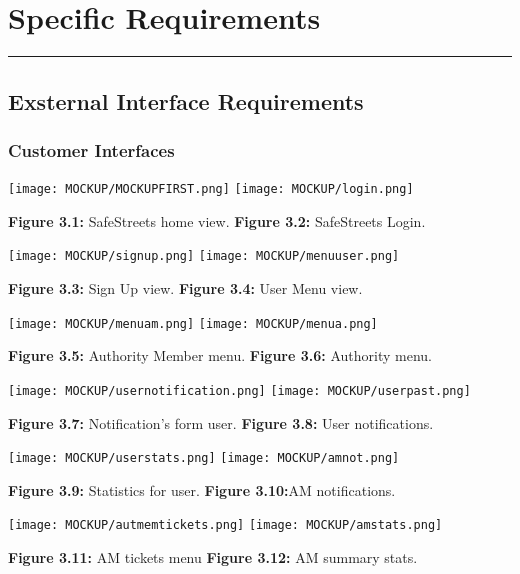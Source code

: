 \documentclass[12pt]{article}
\begin{document}
\newpage
\section{Specific Requirements}
\hrule
\vspace{8mm}
\subsection{Exsternal Interface Requirements}
\vspace{2mm}
\subsubsection{Customer Interfaces}
\vspace{3mm}
		 
		 \texttt{[image: MOCKUP/MOCKUPFIRST.png]}                  \hfill \texttt{[image: MOCKUP/login.png]}
		 
		 \textbf{Figure 3.1:} SafeStreets home view.  \hfill \textbf{Figure 3.2:} SafeStreets Login.
		
\newpage
 	 \texttt{[image: MOCKUP/signup.png]}                  \hfill \texttt{[image: MOCKUP/menuuser.png]}
		 
		 \textbf{Figure 3.3:} Sign Up view.  \hfill \textbf{Figure 3.4:} User Menu view.
		
  \texttt{[image: MOCKUP/menuam.png]}                  \hfill \texttt{[image: MOCKUP/menua.png]}
		 
		 \textbf{Figure 3.5:} Authority Member menu.  \hfill \textbf{Figure 3.6:} Authority menu.

\newpage
 	 \texttt{[image: MOCKUP/usernotification.png]}                  \hfill \texttt{[image: MOCKUP/userpast.png]}
		 
		 \textbf{Figure 3.7:} Notification's form user.  \hfill \textbf{Figure 3.8:} User notifications.
		
  \texttt{[image: MOCKUP/userstats.png]}                  \hfill \texttt{[image: MOCKUP/amnot.png]}
		 
		 \textbf{Figure 3.9:} Statistics for user.  \hfill \textbf{Figure 3.10:}AM notifications.


\newpage
 	 \texttt{[image: MOCKUP/autmemtickets.png]}                  \hfill \texttt{[image: MOCKUP/amstats.png]}
		 
		 \textbf{Figure 3.11:} AM tickets menu   \hfill \textbf{Figure 3.12:} AM summary stats.
		
\end{document}
